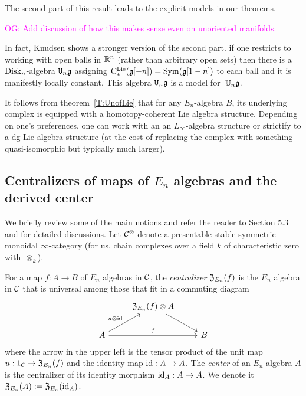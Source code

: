 \documentclass[11pt]{amsart}
\numberwithin{equation}{section}
\def\owen{\textcolor{magenta}{OG: }\textcolor{magenta}}
\begin{document}
The second part of this result leads to the explicit models in our theorems.

\owen{Add discussion of how this makes sense even on unoriented manifolds.}

In fact, Knudsen shows a stronger version of the second part.
if one restricts to working with open balls in $\mathbb R^n$ (rather than arbitrary open sets)
then there is a ${\rm Disk}_n$-algebra ${\tt U}_n \mathfrak g$ assigning ${\rm C}^{\rm Lie}_*(\mathfrak g[-n]) = {\rm Sym}(\mathfrak g[1-n])$ to each ball and it is manifestly locally constant.
This algebra ${\tt U}_n \mathfrak g$ is a model for~$\mathbb U_n \mathfrak g$.

\begin{rmk}
It follows from theorem~\ref{T:UnofLie} that for any $E_n$-algebra $B$, 
its underlying complex is equipped with a homotopy-coherent Lie algebra structure.
Depending on one's preferences, one can work with an an $L_\infty$-algebra structure or strictify to a dg Lie algebra structure (at the cost of replacing the complex with something quasi-isomorphic but typically much larger).
\end{rmk}

\subsection{Centralizers of maps of $E_n$ algebras and the derived center}
\label{sec: centralizer}

We briefly review some of the main notions and refer the reader to \cite{LurieHA} Section 5.3 and \cite{FrancisHH} for detailed discussions. Let $\mathcal C^\otimes$ denote a presentable stable symmetric monoidal $\infty$-category (for us, chain complexes over a field $k$ of characteristic zero with~$\otimes_k$).

\begin{dfn}\label{D:centralizer}
For a map $f: A \to B$ of $E_n$ algebras in $\mathcal C$, 
the {\em centralizer} ${\frak Z}_{E_n}(f)$ is the $E_n$ algebra in $\mathcal C$ that is universal among those that fit in a commuting diagram
\[
\begin{tikzcd}
& {\frak Z}_{E_n}(f) \otimes A \arrow[dr] & \\
A \arrow[ur, "u \otimes \id"] \arrow[rr, "f"] && B
\end{tikzcd}
\]
where the arrow in the upper left is the tensor product of the unit map $u: 1_\mathcal C \to {\frak Z}_{E_n}(f)$ and the identity map ${\rm id}: A \to A$.
The {\em center} of an $E_n$ algebra $A$ is the centralizer of its identity morphism ${\rm id}_A: A \to A$. 
We  denote it ${\frak Z}_{E_n}(A) := {\frak Z}_{E_n}({\rm id}_A)$.
\end{dfn}
\end{document}

